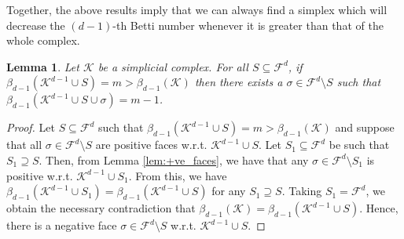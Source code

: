 \documentclass[12pt]{amsart}
\newcommand{\gt}[1]{\textcolor{blue}{#1}}
\renewcommand{\gt}[1]{#1}
\newtheorem{lemma}[theorem]{Lemma}
\numberwithin{equation}{section}
\numberwithin{theorem}{section}
\newcommand{\1}{\mathbf{1}}
\def\F{\mathcal{F}}
\def\K{\mathcal{K}}
\begin{document}
Together, the above results imply that we can always find a simplex which will decrease the \gt{$(d-1)$-th} Betti number \gt{ whenever it is greater than that of the whole complex.}


\begin{lemma}
\label{lem:ExistNegFace}
Let $\K$ be a simplicial complex. For all $S \subseteq \F^d$, if $\beta_{d-1}(\K^{d-1} \cup S) = m > \beta_{d-1}(\K)$ then there exists a $\sigma \in \F^d \setminus S$ such that $\beta_{d-1}(\K^{d-1} \cup S \cup \sigma) = m - 1$.
\end{lemma}
%
\begin{proof}
Let $S \subseteq \F^d$ such that $\beta_{d-1}(\K^{d-1} \cup S) = m > \beta_{d-1}(\K)$ and suppose that all $\sigma \in \F^d \setminus S$ are positive faces w.r.t. $\K^{d-1} \cup S$. Let $S_1 \subseteq \F^d$ be such that $S_1 \supseteq S.$ Then, from Lemma \ref{lem:+ve_faces}, we have that any $\sigma \in \F^d \setminus S_1$ is positive w.r.t. $\K^{d - 1} \cup S_1.$ From this, we have $\beta_{d-1}(\K^{d-1} \cup S_1) = \beta_{d-1}(\K^{d-1} \cup S)$ for any $S_1 \supseteq S$. Taking $S_1 = \F^d$, we obtain the necessary contradiction that $\beta_{d - 1}(\K) = \beta_{d-1}(\K^{d-1} \cup S).$ Hence, there is a negative face $\sigma \in \F^d \setminus S$ w.r.t. $\K^{d-1} \cup S$.
\end{proof}
\end{document}
